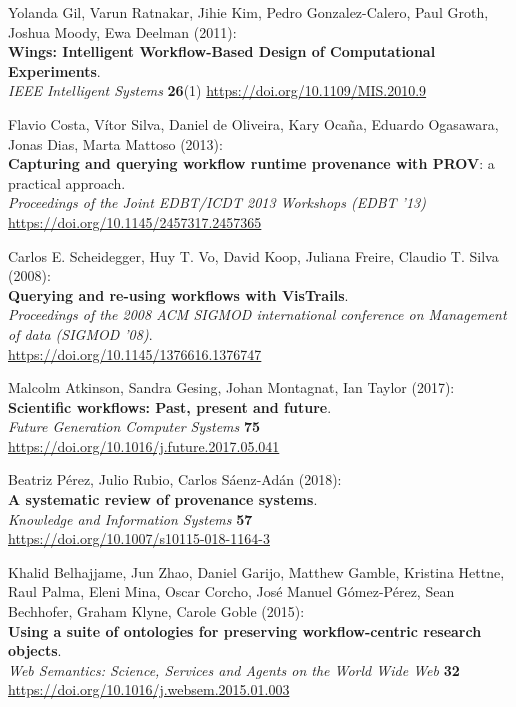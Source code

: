 \documentclass[10pt,letterpaper]{article}
\begin{document}
\begin{thebibliography}{10}
\begin{small}
Yolanda Gil, Varun Ratnakar, Jihie Kim, Pedro Gonzalez-Calero, Paul Groth, Joshua Moody, Ewa Deelman (2011):\\
\textbf{Wings: Intelligent Workflow-Based Design of Computational Experiments}.\\
\emph{IEEE Intelligent Systems} \textbf{26}(1)
\url{https://doi.org/10.1109/MIS.2010.9}


Flavio Costa, Vítor Silva, Daniel de Oliveira, Kary Ocaña, Eduardo Ogasawara, Jonas Dias, Marta Mattoso (2013):\\
\textbf{Capturing and querying workflow runtime provenance with PROV}: a practical approach.\\
\emph{Proceedings of the Joint EDBT/ICDT 2013 Workshops (EDBT '13)}\\
\url{https://doi.org/10.1145/2457317.2457365} 


 Carlos E. Scheidegger, Huy T. Vo, David Koop, Juliana Freire, Claudio T. Silva (2008):\\
\textbf{Querying and re-using workflows with VisTrails}.\\
\emph{Proceedings of the 2008 ACM SIGMOD international conference on Management of data (SIGMOD '08)}.\\
\url{https://doi.org/10.1145/1376616.1376747}

Malcolm Atkinson, Sandra Gesing, Johan Montagnat, Ian Taylor (2017):\\
\textbf{Scientific workflows: Past, present and future}.\\
\emph{Future Generation Computer Systems} \textbf{75}\\
\url{https://doi.org/10.1016/j.future.2017.05.041}

Beatriz Pérez, Julio Rubio, Carlos Sáenz-Adán (2018):\\
\textbf{A systematic review of provenance systems}.\\
\emph{Knowledge and Information Systems} \textbf{57}\\
\url{https://doi.org/10.1007/s10115-018-1164-3} 


Khalid Belhajjame, Jun Zhao, Daniel Garijo, Matthew Gamble, Kristina Hettne, Raul Palma, Eleni Mina, Oscar Corcho, José Manuel Gómez-Pérez, Sean Bechhofer, Graham Klyne, Carole Goble
(2015):\\
\textbf{Using a suite of ontologies for preserving workflow-centric research objects}.\\
\emph{Web Semantics: Science, Services and Agents on the World Wide Web} \textbf{32}\\
\url{https://doi.org/10.1016/j.websem.2015.01.003}



\end{small}
\end{thebibliography}
\end{document}
